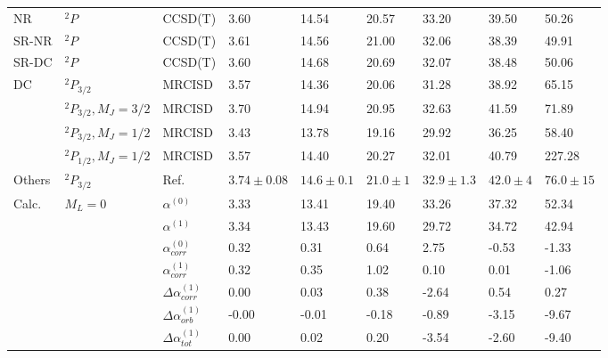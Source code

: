 \begin{longtable}{lllllllll}
\bottomrule
\endlastfoot
NR & $^2P$ & CCSD(T) &           3.60 &         14.54 &       20.57 &         33.20 &       39.50 &        50.26 \\
SR-NR & $^2P$ & CCSD(T) &           3.61 &         14.56 &       21.00 &         32.06 &       38.39 &        49.91 \\
SR-DC & $^2P$ & CCSD(T) &           3.60 &         14.68 &       20.69 &         32.07 &       38.48 &        50.06 \\
DC & $^2P_{3/2}$ & MRCISD &           3.57 &         14.36 &       20.06 &         31.28 &       38.92 &        65.15 \\
      & $^2P_{3/2}, M_J=3/2$ & MRCISD &           3.70 &         14.94 &       20.95 &         32.63 &       41.59 &        71.89 \\
      & $^2P_{3/2}, M_J=1/2$ & MRCISD &           3.43 &         13.78 &       19.16 &         29.92 &       36.25 &        58.40 \\
      & $^2P_{1/2}, M_J=1/2$ & MRCISD &           3.57 &         14.40 &       20.27 &         32.01 &       40.79 &       227.28 \\
Others & $^2P_{3/2}$ & Ref. \cite{Schwerdtfeger2019} &  $3.74\pm0.08$ &  $14.6\pm0.1$ &  $21.0\pm1$ &  $32.9\pm1.3$ &  $42.0\pm4$ &  $76.0\pm15$ \\
Calc. & $M_L=0$ & $\alpha^{(0)}$ &           3.33 &         13.41 &       19.40 &         33.26 &       37.32 &        52.34 \\
      &       & $\alpha^{(1)}$ &           3.34 &         13.43 &       19.60 &         29.72 &       34.72 &        42.94 \\
      &       & $\alpha_{corr}^{(0)}$ &           0.32 &          0.31 &        0.64 &          2.75 &       -0.53 &        -1.33 \\
      &       & $\alpha_{corr}^{(1)}$ &           0.32 &          0.35 &        1.02 &          0.10 &        0.01 &        -1.06 \\
      &       & $\Delta \alpha_{corr}^{(\text{1})}$ &           0.00 &          0.03 &        0.38 &         -2.64 &        0.54 &         0.27 \\
      &       & $\Delta \alpha_{orb}^{(\text{1})}$ &          -0.00 &         -0.01 &       -0.18 &         -0.89 &       -3.15 &        -9.67 \\
      &       & $\Delta \alpha_{tot}^{(\text{1})}$ &           0.00 &          0.02 &        0.20 &         -3.54 &       -2.60 &        -9.40 \\

\end{longtable}
